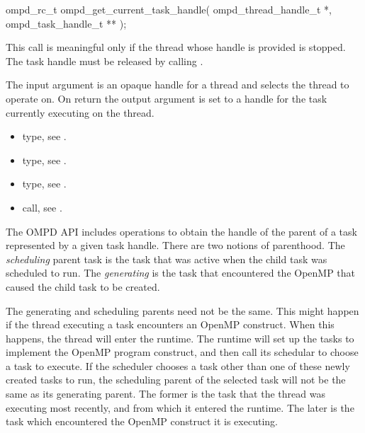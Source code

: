 \format

\begin{cspecific}
\begin{ompSyntax}
ompd_rc_t ompd_get_current_task_handle(
  ompd_thread_handle_t *,
  ompd_task_handle_t **
);
\end{ompSyntax}
\end{cspecific}


\descr
This call is meaningful only if the thread whose handle is provided is stopped.
The task handle must be released by calling .

\argdesc
The input argument  is an opaque handle for a thread and selects the thread to operate on.
On return the output argument  is set to a handle for the task
currently executing on the thread.

\crossreferences
\begin{itemize}
  \item {} type, see .
	\item {} type, see .
	\item {} type, see .
	\item {} call, see .
\end{itemize}

The OMPD API includes operations to obtain the handle of the parent of a task represented by a
given task handle. There are two notions of parenthood. The \emph{scheduling} parent task is the
task that was active when the child task was scheduled to run. The \emph{generating} is the task
that encountered the OpenMP that caused the child task to be created.

The generating and scheduling parents need not be the same. This might happen if the thread
executing a task encounters an OpenMP construct. When this happens, the thread will enter the
runtime. The runtime will set up the tasks to implement the OpenMP program construct, and then
call its schedular to choose a task to execute. If the scheduler chooses a task other than one of
these newly created tasks to run, the scheduling parent of the selected task will not be the same
as its generating parent. The former is the task that the thread was executing most recently,
and from which it entered the runtime. The later is the task which encountered the OpenMP
construct it is executing.

